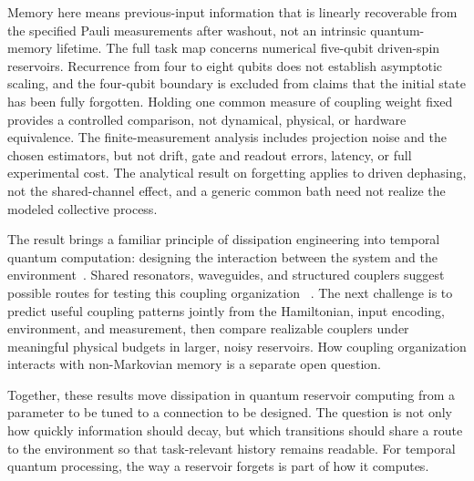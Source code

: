 Memory here means previous-input information that is linearly recoverable from
the specified Pauli measurements after washout, not an intrinsic quantum-memory
lifetime. The full task map concerns numerical five-qubit driven-spin
reservoirs. Recurrence from four to eight qubits does not establish asymptotic
scaling, and the four-qubit boundary is excluded from claims that the initial
state has been fully forgotten. Holding one common measure of coupling weight
fixed provides a controlled comparison, not dynamical, physical, or hardware
equivalence. The finite-measurement analysis includes projection noise and the
chosen estimators, but not drift, gate and readout errors, latency, or full
experimental cost. The analytical result on forgetting applies to driven
dephasing, not the shared-channel effect, and a generic common bath need not
realize the modeled collective process.

The result brings a familiar principle of dissipation engineering into temporal
quantum computation: designing the interaction between the system and the
environment~\cite{Poyatos1996,Verstraete2009,Pastawski2011,Harrington2022}. Shared
resonators, waveguides, and structured couplers suggest possible routes for
testing this coupling organization
~\cite{Cattaneo2019,Brehm2021,Sheremet2023,CattaneoPRX2023}. The next challenge
is to predict useful coupling patterns jointly from the Hamiltonian, input
encoding, environment, and measurement, then compare realizable couplers under
meaningful physical budgets in larger, noisy reservoirs. How coupling
organization interacts with non-Markovian memory is a separate open question.

Together, these results move dissipation in quantum reservoir computing from a
parameter to be tuned to a connection to be designed. The question is not only
how quickly information should decay, but which transitions should share a
route to the environment so that task-relevant history remains readable. For
temporal quantum processing, the way a reservoir forgets is part of how it
computes.
